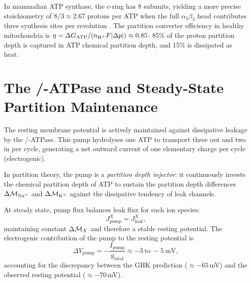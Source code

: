 \begin{remark}
In mammalian ATP synthase, the $c$-ring has 8 subunits, yielding a more
precise stoichiometry of $8/3 \approx 2.67$ protons per ATP when the full
$\alpha_3\beta_3$ head contributes three synthesis sites per revolution
\citep{Walker1994}. The partition converter efficiency in healthy mitochondria
is $\eta = \Delta G_{\mathrm{ATP}} / (n_{\ce{H+}} F|\Delta p|) \approx 0.85$:
85\% of the proton partition depth is captured in ATP chemical partition depth,
and 15\% is dissipated as heat.
\end{remark}

\section{The \texorpdfstring{/}{Na+/K+}-ATPase and Steady-State Partition Maintenance}
\label{sec:naka_atpase}

The resting membrane potential is actively maintained against dissipative
leakage by the /-ATPase. This pump hydrolyses one ATP to
transport three  out and two  in per cycle, generating a net
outward current of one elementary charge per cycle (electrogenic).

In partition theory, the pump is a \emph{partition depth injector}: it
continuously invests the chemical partition depth of ATP to sustain the
partition depth differences $\Delta\Depth_{\ce{Na+}}$ and $\Delta\Depth_{\ce{K+}}$
against the dissipative tendency of leak channels.

\begin{proposition}
\label{prop:partition_balance}
At steady state, pump flux balances leak flux for each ion species:
\begin{equation}
  J_{\mathrm{pump}}^X = J_{\mathrm{leak}}^X,
  \label{eq:partition_balance}
\end{equation}
maintaining constant $\Delta\mathcal{M}_X$ and therefore a stable resting potential.
The electrogenic contribution of the pump to the resting potential is
\begin{equation}
  \Delta V_{\mathrm{pump}}
    = -\frac{I_{\mathrm{pump}}}{g_{\mathrm{total}}}
    \approx -3\ \text{to}\ -5\ \mathrm{mV},
  \label{eq:pump_hyperpolarization}
\end{equation}
accounting for the discrepancy between the GHK prediction ($\approx -65$\,mV)
and the observed resting potential ($\approx -70$\,mV).
\end{proposition}


